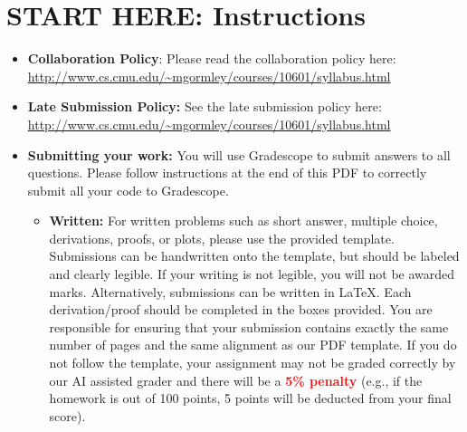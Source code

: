 \newcommand \maxsubs {10 }
\section*{START HERE: Instructions}
\begin{itemize}

\item \textbf{Collaboration Policy}: Please read the collaboration policy here: \url{http://www.cs.cmu.edu/~mgormley/courses/10601/syllabus.html}

\item\textbf{Late Submission Policy:} See the late submission policy here: \url{http://www.cs.cmu.edu/~mgormley/courses/10601/syllabus.html}

\item\textbf{Submitting your work:} You will use Gradescope to submit
  answers to all questions. Please
  follow instructions at the end of this PDF to correctly submit all your code to Gradescope.

  \begin{itemize}
    
\begin{comment}
  \item \textbf{Canvas:} Canvas (\url{https://canvas.cmu.edu}) will be
    used for quiz-style problems (e.g. multiple choice, true / false,
    numerical answers). Grading is done automatically.
    You may only \textbf{submit once} on canvas, so be sure of your
    answers before you submit. However, canvas allows you to work on
    your answers and then close out of the page and it will save your
    progress.  You will not be granted additional submissions, so
    please be confident of your solutions when you are submitting your
    assignment.
    {\color{red} The above is true for future assignments, but this one
    allows {\bf unlimited submissions}.}
\end{comment}
    
   \item \textbf{Written:} For written problems such as short answer, multiple choice, derivations, proofs, or plots, please use the provided template. Submissions can be handwritten onto the template, but should be labeled and clearly legible. If your writing is not legible, you will not be awarded marks. Alternatively, submissions can be written in \LaTeX{}. Each derivation/proof should be completed in the boxes provided. You are responsible for ensuring that your submission contains exactly the same number of pages and the same alignment as our PDF template. If you do not follow the template, your assignment may not be graded correctly by our AI assisted grader and there will be a \textbf{\textcolor{red}{5\% penalty}} (e.g., if the homework is out of 100 points, 5 points will be deducted from your final score).


\end{itemize}
\end{itemize}
